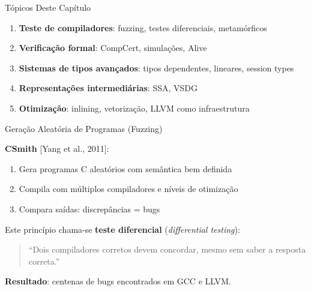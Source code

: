 \begin{frame}{Tópicos Deste Capítulo}

    \begin{enumerate}

        \item
        \textbf{Teste de compiladores}: fuzzing, testes diferenciais,
        metamórficos
        \item
        \textbf{Verificação formal}: CompCert, simulações, Alive
        \item
        \textbf{Sistemas de tipos avançados}: tipos dependentes, lineares,
        session types
        \item
        \textbf{Representações intermediárias}: SSA, VSDG
        \item
        \textbf{Otimização}: inlining, vetorização, LLVM como infraestrutura
    \end{enumerate}
\end{frame}



\begin{frame}{Geração Aleatória de Programas (Fuzzing)}

    \textbf{CSmith} {[}Yang et al., 2011{]}:

    \begin{enumerate}

        \item
        Gera programas C aleatórios com semântica bem definida
        \item
        Compila com múltiplos compiladores e níveis de otimização
        \item
        Compara saídas: discrepâncias = bugs
    \end{enumerate}

    Este princípio chama-se \textbf{teste diferencial} (\emph{differential
    testing}):

    \begin{quote}
        ``Dois compiladores corretos devem concordar, mesmo sem saber a resposta
        correta.''
    \end{quote}

    \textbf{Resultado}: centenas de bugs encontrados em GCC e LLVM.
\end{frame}

